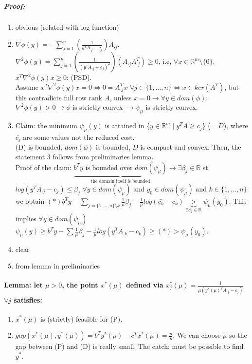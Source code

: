 \documentclass[main]{subfiles}
\begin{document}
\subparagraph{Proof:}
\begin{enumerate}
\item obvious (related with log function)
\item $\nabla \phi(y) = - \sum_{j = 1}^{n} (\frac{1}{y^T A_{\cdot j} - c_j})
A_{\cdot j}$.\\
$\nabla^2 \phi(y) = \sum_{j = 1}^{n} (\frac{1}{(y^T A_{\cdot j} - c_j)^2})
(A_{\cdot j} A_{\cdot j}^T) \geq 0$, i.e, $\forall x \in \mathbb{R}^m\setminus
\{0\}$, $x^T \nabla^2 \phi(y) x \geq 0$: (PSD).\\
Assume $x^T \nabla^2 \phi(y)x = 0 \iff 0 = A_{\cdot j}^T x$ $\forall j \in
\{1, \dots, n\} \iff x \in ker(A^T)$, but this contradicts full row rank $A$,
unless $x = 0 \rightarrow \forall y \in dom(\phi)$: $\nabla^2 \phi(y) > 0
\rightarrow \phi$ is strictly convex $\rightarrow \psi_\mu$ is strictly convex.
\item Claim: the minimum $\psi_\mu(y)$ is attained in $\{y \in \mathbb{R}^m
\mid y^T A \geq \bar{c_j } \}$ (= $\bar{D}$), where $\bar{c_j}$ are some values
not the reduced cost.\\
(D) is bounded, $dom(\phi)$ is bounded, $\bar{D}$ is compact and convex. Then,
the statement 3 follows from preliminaries lemma.\\
Proof of the claim: $\underbrace{b^T y \text{ is bounded over }
dom(\psi_\mu)}_{\text{the domain itself is bounded}} \rightarrow \exists
\beta_j \in \mathbb{R}$ st $log(y^T A_{\cdot j} - c_j) \leq \beta_j$
$\forall y \in dom(\psi_\mu)$ and $y_0 \in dom(\psi_\mu)$ and
$k \in \{1, \dots, n\}$ we obtain $(*) b^T y - \sum_{j = \{1, \dots, n\}
\setminus k} \frac{1}{\mu} \beta_j - \frac{1}{\mu} log(\bar{c_k} - c_k)
\underbrace{>}_{\exists \bar{c_k}
\in \mathbb{R}} \psi_\mu(y_0)$. This implies $\forall y \in dom(\psi_\mu)$
$\psi_\mu(y) \geq b^T y - \sum \frac{1}{\mu} \beta_j - \frac{1}{\mu} log(y^T
A_{\cdot k} - c_k) \geq (*) > \psi_\mu(y_0)$.
\item clear
\item from lemma in preliminaries
\end{enumerate}

\paragraph{Lemma: let $\mu > 0$, the point $x^*(\mu)$  defined via $x^*_j(\mu) =
\frac{1}{\mu (y^*(\mu)^T A_{\cdot j} - c_j)}$ $\forall j$ satisfies:}

\begin{enumerate}
\item $x^*(\mu)$ is (strictly) feasible for (P).
\item $gap(x^*(\mu), y^*(\mu)) = b^T y^*(\mu) - c^T x^*(\mu) = \frac{n}{\mu}$.
We can choose $\mu$ so the gap between (P) and (D) is really small. The catch:
must be possible to find $y^*$.
\end{enumerate}
\end{document}
